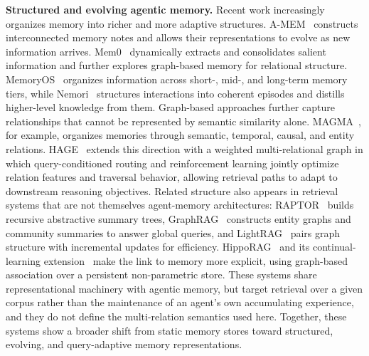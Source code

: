 \documentclass[11pt]{article}
\begin{document}
\noindent\textbf{Structured and evolving agentic memory.}
Recent work increasingly organizes memory into richer and more adaptive structures. A-MEM~\citep{xu2025mem} constructs interconnected memory notes and allows their representations to evolve as new information arrives. Mem0~\citep{chhikara2025mem0} dynamically extracts and consolidates salient information and further explores graph-based memory for relational structure. MemoryOS~\citep{Kang2025} organizes information across short-, mid-, and long-term memory tiers, while Nemori~\citep{nan2025nemori} structures interactions into coherent episodes and distills higher-level knowledge from them. Graph-based approaches further capture relationships that cannot be represented by semantic similarity alone. MAGMA~\citep{jiang2026magma}, for example, organizes memories through semantic, temporal, causal, and entity relations. HAGE~\citep{jiang2026hage} extends this direction with a weighted multi-relational graph in which query-conditioned routing and reinforcement learning jointly optimize relation features and traversal behavior, allowing retrieval paths to adapt to downstream reasoning objectives. Related structure also appears in retrieval systems that are not themselves agent-memory architectures: RAPTOR~\citep{sarthi2024raptor} builds recursive abstractive summary trees, GraphRAG~\citep{edge2024graphrag} constructs entity graphs and community summaries to answer global queries, and LightRAG~\citep{guo2024lightrag} pairs graph structure with incremental updates for efficiency. HippoRAG~\citep{jimenez2024hipporag} and its continual-learning extension~\citep{gutierrez2025rag} make the link to memory more explicit, using graph-based association over a persistent non-parametric store. These systems share representational machinery with agentic memory, but target retrieval over a given corpus rather than the maintenance of an agent's own accumulating experience, and they do not define the multi-relation semantics used here. Together, these systems show a broader shift from static memory stores toward structured, evolving, and query-adaptive memory representations.
\end{document}
